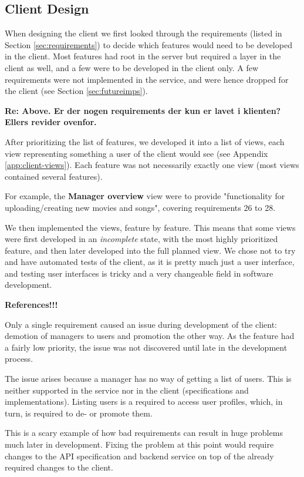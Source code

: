 \subsection{Client Design}

When designing the client we first looked through the requirements (listed in
Section \ref{sec:requirements}) to decide which features would need to be
developed in the client. Most features had root in the server but required a
layer in the client as well, and a few were to be developed in the client only.
A few requirements were not implemented in the service, and were hence dropped
for the client (see Section \ref{sec:futureimps}).

\textbf{Re: Above. Er der nogen requirements der kun er lavet i klienten? Ellers
revider ovenfor.}

After prioritizing the list of features, we developed it into a list of views,
each view representing something a user of the client would see (see Appendix
\ref{app:client-views}). Each feature was not necessarily exactly one view (most
views contained several features).

For example, the \textbf{Manager overview} view were to provide "functionality
for uploading/creating new movies and songs", covering requirements 26 to 28.

We then implemented the views, feature by feature. This means that some views
were first developed in an \emph{incomplete} state, with the most highly
prioritized feature, and then later developed into the full planned view. We
chose not to try and have automated tests of the client, as it is pretty much
just a user interface, and testing user interfaces is tricky and a very
changeable field in software development.

\textbf{References!!!}

Only a single requirement caused an issue during development of the client:
demotion of managers to users and promotion the other way. As the feature
had a fairly low priority, the issue was not discovered until late in the
development process.

The issue arises because a manager has no way of getting a list of users. This
is neither supported in the service nor in the client (specifications and
implementations). Listing users is a required to access user profiles, which, in
turn, is required to de- or promote them.

This is a scary example of how bad requirements can result in huge problems much
later in development. Fixing the problem at this point would require changes to
the API specification and backend service on top of the already required changes
to the client.

